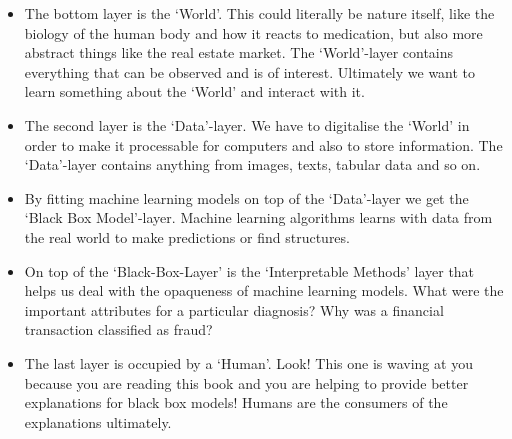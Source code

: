 \documentclass[12pt,]{krantz}
\providecommand{\tightlist}{%
  \setlength{\itemsep}{0pt}\setlength{\parskip}{0pt}}
\theoremstyle{definition}
\theoremstyle{definition}
\theoremstyle{definition}
\theoremstyle{remark}
\begin{document}
\begin{itemize}
\tightlist
\item
  The bottom layer is the `World'. This could literally be nature
  itself, like the biology of the human body and how it reacts to
  medication, but also more abstract things like the real estate market.
  The `World'-layer contains everything that can be observed and is of
  interest. Ultimately we want to learn something about the `World' and
  interact with it.
\item
  The second layer is the `Data'-layer. We have to digitalise the
  `World' in order to make it processable for computers and also to
  store information. The `Data'-layer contains anything from images,
  texts, tabular data and so on.
\item
  By fitting machine learning models on top of the `Data'-layer we get
  the `Black Box Model'-layer. Machine learning algorithms learns with
  data from the real world to make predictions or find structures.
\item
  On top of the `Black-Box-Layer' is the `Interpretable Methods' layer
  that helps us deal with the opaqueness of machine learning models.
  What were the important attributes for a particular diagnosis? Why was
  a financial transaction classified as fraud?
\item
  The last layer is occupied by a `Human'. Look! This one is waving at
  you because you are reading this book and you are helping to provide
  better explanations for black box models! Humans are the consumers of
  the explanations ultimately.
\end{itemize}
\end{document}
